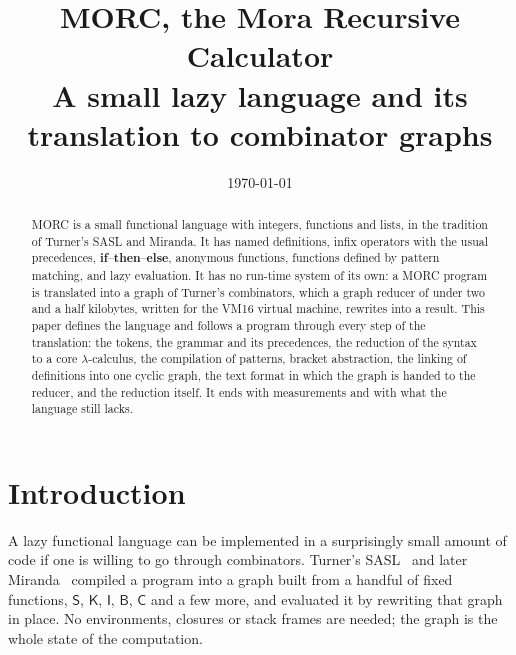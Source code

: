 \documentclass[11pt,a4paper]{article}
\title{MORC, the Mora Recursive Calculator\\[4pt]\large A small lazy language and its translation to combinator graphs}
\author{}
\date{\today}
\newcommand{\cmb}[1]{\textsf{#1}}
\newcommand{\I}{\cmb{I}}
\newcommand{\K}{\cmb{K}}
\newcommand{\Sc}{\cmb{S}}
\newcommand{\B}{\cmb{B}}
\newcommand{\C}{\cmb{C}}
\theoremstyle{definition}
\theoremstyle{plain}
\newcommand{\kw}[1]{\textbf{#1}}
\begin{document}
\maketitle

\begin{abstract}
\noindent
MORC is a small functional language with integers, functions and lists, in
the tradition of Turner's SASL and Miranda. It has named definitions, infix
operators with the usual precedences, \kw{if}--\kw{then}--\kw{else},
anonymous functions, functions defined by pattern matching, and lazy
evaluation. It has no run-time system of its own:
a MORC program is translated into a graph of Turner's combinators, which a
graph reducer of under two and a half kilobytes, written for the VM16
virtual machine,
rewrites into a result. This paper defines the language and follows a program
through every step of the translation: the tokens, the grammar and its
precedences, the reduction of the syntax to a core $\lambda$-calculus, the
compilation of patterns, bracket abstraction, the linking of definitions into one cyclic graph, the text format
in which the graph is handed to the reducer, and the reduction itself. It ends
with measurements and with what the language still lacks.
\end{abstract}

\tableofcontents

\section{Introduction}\label{sec:intro}

A lazy functional language can be implemented in a surprisingly small amount
of code if one is willing to go through combinators. Turner's
SASL~\cite{turner79} and later Miranda~\cite{turner85} compiled a program into
a graph built from a handful of fixed functions, $\Sc$, $\K$, $\I$, $\B$,
$\C$ and a few more, and evaluated it by rewriting that graph in place. No
environments, closures or stack frames are needed; the graph is the whole
state of the computation.
\end{document}
